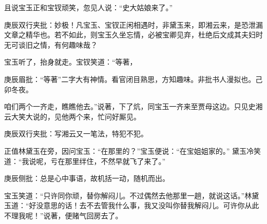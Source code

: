 \begin{parag}


    且说宝玉正和宝钗顽笑，忽见人说：“史大姑娘来了。”\begin{note}庚辰双行夹批：妙极！凡宝玉、宝钗正闲相遇时，非黛玉来，即湘云来，是恐泄漏文章之精华也。若不如此，则宝玉久坐忘情，必被宝卿见弃，杜绝后文成其夫妇时无可谈旧之情，有何趣味哉？\end{note}宝玉听了，抬身就走。宝钗笑道：“等著，\begin{note}庚辰眉批：“等著”二字大有神情。看官闭目熟思，方知趣味。非批书人漫拟也。己卯冬夜。\end{note}咱们两个一齐走，瞧瞧他去。”说著，下了炕，同宝玉一齐来至贾母这边。只见史湘云大笑大说的，见他两个来，忙问好厮见。\begin{note}庚辰双行夹批：写湘云又一笔法，特犯不犯。\end{note}正值林黛玉在旁，因问宝玉：“在那里的？”宝玉便说：“在宝姐姐家的。” 黛玉冷笑道：“我说呢，亏在那里绊住，不然早就飞了来了。”\begin{note}庚辰侧批：总是心中事语，故机括一动，随机而出。\end{note}宝玉笑道：“只许同你顽，替你解闷儿。不过偶然去他那里一趟，就说这话。”林黛玉道：“好没意思的话！去不去管我什么事，我又没叫你替我解闷儿。可许你从此不理我呢！”说著，便赌气回房去了。
\end{parag}


